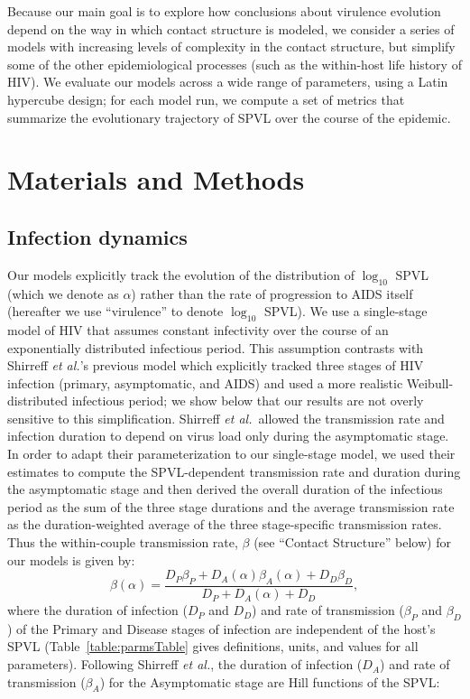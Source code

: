 \documentclass[10pt,letterpaper]{article}
\newcommand{\Lspvl}{$\log_{10}$ SPVL}
\newcommand{\etal}{\textit{et al.}}
\begin{document}
Because our main goal is to explore how conclusions about virulence
evolution depend on the way in which contact structure
is modeled, we consider a series of
models with increasing levels of complexity in the contact
structure, but simplify some of the other epidemiological
processes (such as the within-host life history of HIV). 
We evaluate our models
across a wide range of parameters, using a Latin hypercube design; for
each model run, we compute a set of metrics 
that summarize the evolutionary trajectory of SPVL
over the course of the epidemic.

\section*{Materials and Methods}

\subsection*{Infection dynamics}

Our models
explicitly track the evolution of the distribution of $\log_{10}$ SPVL
(which we denote as $\alpha$)
rather than the rate of progression to
AIDS itself (hereafter we use ``virulence'' to denote \Lspvl).
We use a single-stage model of HIV that assumes constant
infectivity over the course of an exponentially
distributed infectious period. This assumption contrasts
with Shirreff \etal's previous model which
explicitly tracked three stages of HIV infection (primary,
asymptomatic, and AIDS) and used a more realistic
Weibull-distributed infectious period; we show below that our results
are not overly sensitive to this simplification. 
Shirreff \etal\ allowed the transmission rate
and infection duration to depend on virus load only during the
asymptomatic stage. In order to adapt their parameterization to our
single-stage model, we used their estimates to compute the SPVL-dependent transmission
rate and duration during the asymptomatic stage and 
then derived the overall duration of the infectious period
as the sum of the three stage durations and the 
average transmission rate as the duration-weighted 
average of the three stage-specific transmission rates. 
Thus the within-couple transmission rate, $\beta$
(see ``Contact Structure'' below)
for our models is given by:
\begin{equation}
\beta (\alpha) = \frac{D_P \beta_P + D_A (\alpha) \beta_A (\alpha) + D_D \beta_D}{D_P + D_A (\alpha) + D_D},
\end{equation}
where the duration of infection ($D_P$ and $D_D$) and rate of transmission ($\beta_P$ and $\beta_D$) of the Primary and Disease stages
of infection are independent of the host's SPVL
(Table~\ref{table:parmsTable} gives definitions, units, and values for all parameters).
Following Shirreff \etal, the duration of infection ($D_A$) and rate of transmission ($\beta_A$) for the Asymptomatic stage are Hill functions of the SPVL:
\end{document}
